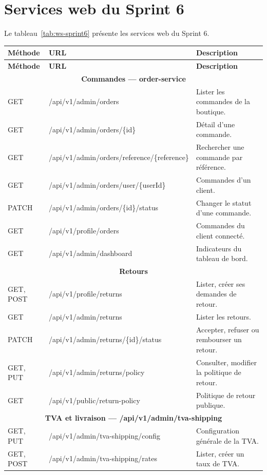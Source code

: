 \section{Services web du Sprint 6}
Le tableau~\ref{tab:ws-sprint6} présente les services web du Sprint 6.
\renewcommand{\arraystretch}{1.15}
\setlength{\tabcolsep}{4pt}
\begin{longtable}{|p{2cm}|p{8.8cm}|p{4.2cm}|}
\hline
\textbf{Méthode} & \textbf{URL} & \textbf{Description} \\
\hline
\endfirsthead
\hline
\textbf{Méthode} & \textbf{URL} & \textbf{Description} \\
\hline
\endhead
\multicolumn{3}{|c|}{\textbf{Commandes --- order-service}} \\
\hline
GET & /api/v1/admin/orders & Lister les commandes de la boutique. \\
\hline
GET & /api/v1/admin/orders/\{id\} & Détail d'une commande. \\
\hline
GET & /api/v1/admin/orders/reference/\{reference\} & Rechercher une commande par référence. \\
\hline
GET & /api/v1/admin/orders/user/\{userId\} & Commandes d'un client. \\
\hline
PATCH & /api/v1/admin/orders/\{id\}/status & Changer le statut d'une commande. \\
\hline
GET & /api/v1/profile/orders & Commandes du client connecté. \\
\hline
GET & /api/v1/admin/dashboard & Indicateurs du tableau de bord. \\
\hline
\multicolumn{3}{|c|}{\textbf{Retours}} \\
\hline
GET, POST & /api/v1/profile/returns & Lister, créer ses demandes de retour. \\
\hline
GET & /api/v1/admin/returns & Lister les retours. \\
\hline
PATCH & /api/v1/admin/returns/\{id\}/status & Accepter, refuser ou rembourser un retour. \\
\hline
GET, PUT & /api/v1/admin/returns/policy & Consulter, modifier la politique de retour. \\
\hline
GET & /api/v1/public/return-policy & Politique de retour publique. \\
\hline
\multicolumn{3}{|c|}{\textbf{TVA et livraison --- /api/v1/admin/tva-shipping}} \\
\hline
GET, PUT & /api/v1/admin/tva-shipping/config & Configuration générale de la TVA. \\
\hline
GET, POST & /api/v1/admin/tva-shipping/rates & Lister, créer un taux de TVA. \\

\end{longtable}
